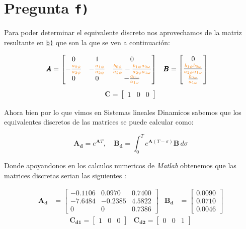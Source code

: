 \section{Pregunta \texttt{f)}}\label{pregunta-f}

Para poder determinar el equivalente discreto nos aprovechamos de la matriz
resultante en \hyperref[pregunta-b]{\texttt{b)}} que son la que se ven a continuación:

\begin{align}
    \pmb{A} &= \begin{bmatrix}
        0 & 1 & 0 \\
        -\frac{\nara{a_{0\psi}}}{\nara{a_{2\psi}}}   & -\frac{\nara{a_{1\psi}}}{\nara{a_{2\psi}}} & \frac{\nara{b_{0\psi}}}{\nara{a_{2\psi}}} - \frac{\nara{b_{1\psi}}\nara{a_{0\omega}}}{\nara{a_{2\psi}}\nara{a_{1\omega}}} \\
        0 & 0 & -\frac{\nara{a_{0\omega}}}{\nara{a_{1\omega}}}
    \end{bmatrix} &
    \pmb{B} &= \begin{bmatrix}
        0 \\
        \frac{\nara{b_{1\psi}}\nara{b_{0\omega}}}{\nara{a_{2\psi}}\nara{a_{1\omega}}} \\
        \frac{\nara{b_{0\omega}}}{\nara{a_{1\omega}}}
    \end{bmatrix}
  \end{align}
  \begin{align}
    \pmb{C} = \begin{bmatrix}
      1 & 0 & 0
    \end{bmatrix}
  \end{align}

Ahora bien por lo que vimos en Sistemas lineales Dinamicos sabemos que los
equivalentes discretos de las matrices se puede calcular como:

\[
\mathbf{A_d}= e^{\mathbf{A}T} ,\quad \mathbf{B_d}= \int_{0}^{T} e^{\mathbf{A}(T-\sigma)}\mathbf{B}  \,d\sigma 
\]

Donde apoyandonos en los calculos numericos de \textit{Matlab} obtenemos que las
matrices discretas serian las siguientes :


\begin{align}
    \mathbf{A_d} &= \begin{bmatrix}
        -0.1106 & 0.0970 & 0.7400 \\
        -7.6484 &  -0.2385 & 4.5822 \\
        0 & 0 & 0.7386
    \end{bmatrix} &
    \mathbf{B_d} &= \begin{bmatrix}
        0.0090 \\
        0.0710 \\
        0.0046
    \end{bmatrix}
  \end{align}
  \begin{align}
    \pmb{C_{d1}} = \begin{bmatrix}
      1 & 0 & 0
    \end{bmatrix}&
    \pmb{C_{d2}} = \begin{bmatrix}
      0 & 0& 1
    \end{bmatrix}
\end{align}

